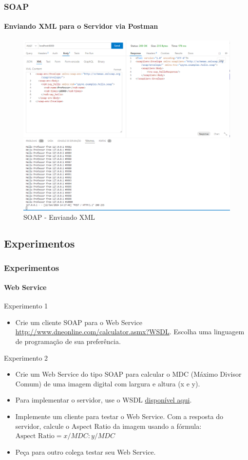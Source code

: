 \documentclass[
	9pt, %
	t, %
]{beamer}
\begin{document}
\begin{frame}[fragile]
	\frametitle{SOAP}
	\framesubtitle{Enviando XML para o Servidor via Postman}

	\begin{figure}
		\includegraphics[width=0.7\linewidth]{soap_http_request_example.PNG}
		\caption{SOAP - Enviando XML}
		\label{fig:soap_server_xml_2}
	\end{figure}

\end{frame}

\subsection{Experimentos}

\begin{frame}
	\frametitle{Experimentos}
	\framesubtitle{Web Service}

	\begin{block}{Experimento 1}
		\begin{itemize}
			\item Crie um cliente SOAP para o Web Service
			      \href{http://www.dneonline.com/calculator.asmx?WSDL}{http://www.dneonline.com/calculator.asmx?WSDL}.
			      Escolha uma linguagem de programação de sua preferência.
		\end{itemize}
	\end{block}

	\begin{block}{Experimento 2}
		\begin{itemize}
			\item Crie um Web Service do tipo SOAP para calcular o MDC (Máximo Divisor Comum) de
			      uma imagem digital com largura e altura (x e y).
			\item Para implementar o servidor, use o WSDL
			      \href{https://gist.github.com/fabricioifc/bf6ccecd92d2aefc7362bdce5342f2c2}{disponível
				      aqui}.
			\item Implemente um cliente para testar o Web Service. Com a resposta do servidor,
			      calcule o Aspect Ratio da imagem usando a fórmula: $\text{Aspect Ratio} =
				      {x/MDC} : {y/MDC}$
			\item Peça para outro colega testar seu Web Service.
		\end{itemize}
	\end{block}

\end{frame}
\end{document}
